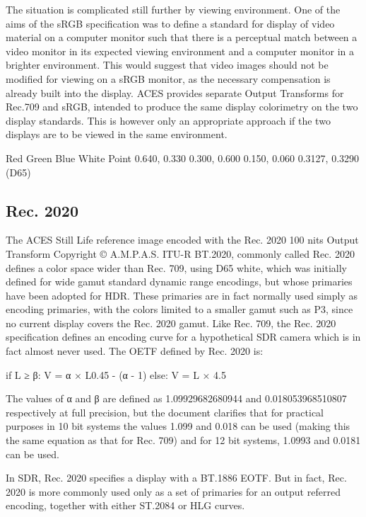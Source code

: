 The situation is complicated still further by viewing environment. One of the aims of the sRGB specification was to define a standard for display of video material on a computer monitor such that there is a perceptual match between a video monitor in its expected viewing environment and a computer monitor in a brighter environment. This would suggest that video images should not be modified for viewing on a sRGB monitor, as the necessary compensation is already built into the display. ACES provides separate Output Transforms for Rec.709 and sRGB, intended to produce the same display colorimetry on the two display standards. This is however only an appropriate approach if the two displays are to be viewed in the same environment.



Red
Green
Blue
White Point
0.640, 0.330
0.300, 0.600
0.150, 0.060
0.3127, 0.3290 (D65)

\subsection{Rec. 2020}

The ACES Still Life reference image encoded with the Rec. 2020 100 nits Output Transform
Copyright © A.M.P.A.S.
ITU-R BT.2020, commonly called Rec. 2020 defines a color space wider than Rec. 709, using D65 white, which was initially defined for wide gamut standard dynamic range encodings, but whose primaries have been adopted for HDR. These primaries are in fact normally used simply as encoding primaries, with the colors limited to a smaller gamut such as P3, since no current display covers the Rec. 2020 gamut. Like Rec. 709, the Rec. 2020 specification defines an encoding curve for a hypothetical SDR camera which is in fact almost never used. The OETF defined by Rec. 2020 is:

	if L ≥ β:
            		V = α × L0.45 - (α - 1)
	else:
		V = L × 4.5

The values of α and β are defined as 1.09929682680944 and 0.018053968510807 respectively at full precision, but the document clarifies that for practical purposes in 10 bit systems the values 1.099 and 0.018 can be used (making this the same equation as that for Rec. 709) and for 12 bit systems, 1.0993 and 0.0181 can be used.

In SDR, Rec. 2020 specifies a display with a BT.1886 EOTF. But in fact, Rec. 2020 is more commonly used only as a set of primaries for an output referred encoding, together with either ST.2084 or HLG curves.

